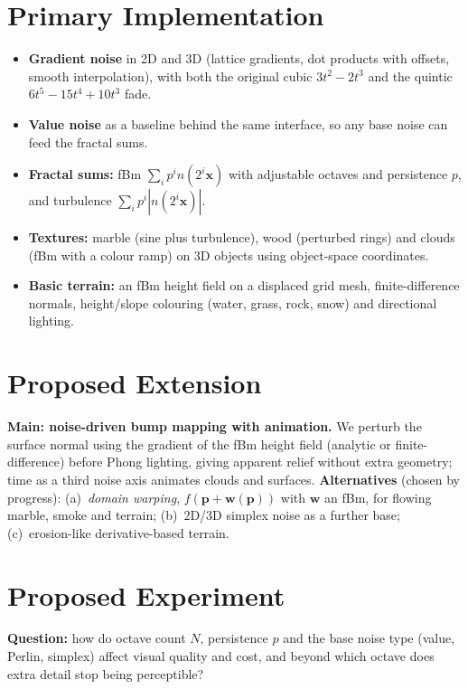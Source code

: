 \documentclass[acmlarge,nonacm]{acmart}
\begin{document}
\section{Primary Implementation}\label{sec:primary}
\begin{itemize}
\item \textbf{Gradient noise} in 2D and 3D (lattice gradients, dot products with offsets, smooth interpolation), with both the original cubic $3t^2-2t^3$ and the quintic $6t^5-15t^4+10t^3$ fade.
\item \textbf{Value noise} as a baseline behind the same interface, so any base noise can feed the fractal sums.
\item \textbf{Fractal sums:} fBm $\sum_i p^i n(2^i\mathbf{x})$ with adjustable octaves and persistence $p$, and turbulence $\sum_i p^i |n(2^i\mathbf{x})|$.
\item \textbf{Textures:} marble (sine plus turbulence), wood (perturbed rings) and clouds (fBm with a colour ramp) on 3D objects using object-space coordinates.
\item \textbf{Basic terrain:} an fBm height field on a displaced grid mesh, finite-difference normals, height/slope colouring (water, grass, rock, snow) and directional lighting.
\end{itemize}

\section{Proposed Extension}\label{sec:ext}
\textbf{Main: noise-driven bump mapping with animation.} We perturb the surface normal using the gradient of the fBm height field (analytic or finite-difference) before Phong lighting, giving apparent relief without extra geometry; time as a third noise axis animates clouds and surfaces.
\textbf{Alternatives} (chosen by progress): (a)~\emph{domain warping}, $f(\mathbf{p}+\mathbf{w}(\mathbf{p}))$ with $\mathbf{w}$ an fBm, for flowing marble, smoke and terrain; (b)~2D/3D simplex noise as a further base; (c)~erosion-like derivative-based terrain.

\section{Proposed Experiment}\label{sec:exp}
\textbf{Question:} how do octave count $N$, persistence $p$ and the base noise type (value, Perlin, simplex) affect visual quality and cost, and beyond which octave does extra detail stop being perceptible?
\end{document}
